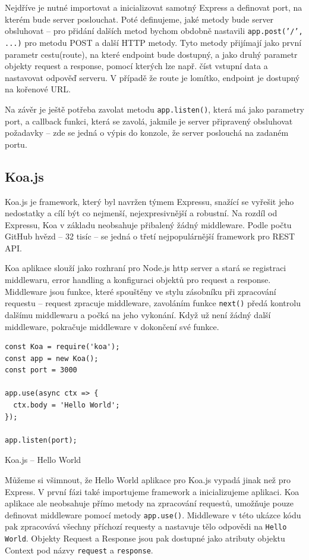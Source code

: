 \documentclass[thesis=M,czech]{FITthesis}[2019/12/23]
\begin{document}
Nejdříve je nutné importovat a inicializovat samotný Express a definovat port, na kterém bude server poslouchat. Poté definujeme, jaké metody bude server obsluhovat -- pro přidání dalších metod bychom obdobně nastavili \texttt{app.post('/', ...)} pro metodu POST a další HTTP metody. Tyto metody přijímají jako první parametr cestu(route), na které endpoint bude dostupný, a jako druhý parametr objekty request a response, pomocí kterých lze např. číst vstupní data a nastavovat odpověď serveru. V případě že route je lomítko, endpoint je dostupný na kořenové URL.

Na závěr je ještě potřeba zavolat metodu \texttt{app.listen()}, která má jako parametry port, a callback funkci, která se zavolá, jakmile je server připravený obsluhovat požadavky -- zde se jedná o výpis do konzole, že server poslouchá na zadaném portu.

\subsection{Koa.js}
Koa.js \cite{koa} je framework, který byl navržen týmem Expressu, snažící se vyřešit jeho nedostatky a cílí být co nejmenší, nejexpresivnější a robustní. Na rozdíl od Expressu, Koa v základu neobsahuje přibalený žádný middleware. Podle počtu GitHub hvězd -- 32 tisíc -- se jedná o třetí nejpopulárnější framework pro REST API.

Koa aplikace slouží jako rozhraní pro Node.js http server a stará se registraci middlewaru, error handling a konfiguraci objektů pro request a response.
Middleware jsou funkce, které spouštěny ve stylu zásobníku při zpracování requestu -- request zpracuje middleware, zavoláním funkce \texttt{next()} předá kontrolu dalšímu middlewaru a počká na jeho vykonání. Když už není žádný další middleware, pokračuje middleware v dokončení své funkce.

\begin{listing}[H]
\begin{verbatim}
const Koa = require('koa');
const app = new Koa();
const port = 3000

app.use(async ctx => {
  ctx.body = 'Hello World';
});

app.listen(port);
\end{verbatim}
\caption{Koa.js -- Hello World}
\label{lst:koa_hello}
\end{listing}

Můžeme si všimnout, že Hello World aplikace pro Koa.js vypadá jinak než pro Express. V první fázi také importujeme framework a inicializujeme aplikaci. Koa aplikace ale neobsahuje přímo metody na zpracování requestů, umožňuje pouze definovat middleware pomocí metody \texttt{app.use()}. Middleware v této ukázce kódu pak zpracovává všechny příchozí requesty a nastavuje tělo odpovědi na \texttt{Hello World}. Objekty Request a Response jsou pak dostupné jako atributy objektu Context pod názvy \texttt{request} a \texttt{response}.
\end{document}
